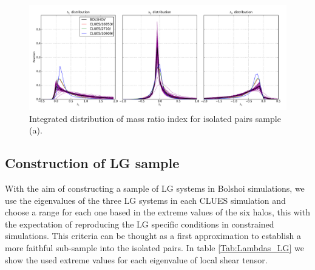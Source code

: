 \documentclass[usenatbib]{mn2e}
\begin{document}
\begin{figure}
\begin{center}

\includegraphics[keepaspectratio=true,width=0.75\textheight]
{./figures/All_Lambda_Histogram.pdf}

\caption{\small Integrated distribution of mass ratio index for isolated 
pairs sample (a).}

\label{fig:lambda_histogram}

\vspace{0.1 cm}
\end{center}
\end{figure}


\subsection{Construction of LG sample}
\label{subsec:LG_construction}


With the aim of constructing a sample of LG systems in Bolshoi simulations, 
we use the eigenvalues of the three LG systems in each CLUES simulation 
and choose a range for each one based in the extreme values of the six 
halos, this with the expectation of reproducing the LG specific conditions 
in constrained simulations. This criteria can be thought as a first 
approximation to establish a more faithful sub-sample into the isolated 
pairs. In table \ref{Tab:Lambdas_LG} we show the used extreme values for 
each eigenvalue of local shear tensor.
\end{document}
